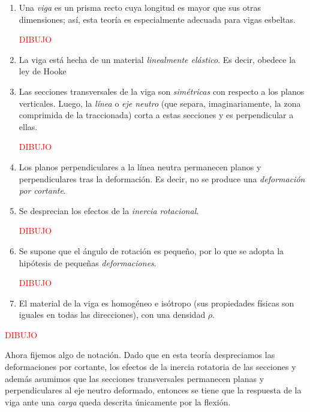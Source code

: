 \begin{enumerate}
    \item Una \textit{viga} es un prisma recto cuya longitud es mayor que sus otras dimensiones; así, esta teoría es especialmente adecuada para vigas esbeltas.

    \textcolor{red}{DIBUJO}

    \item La viga está hecha de un material \textit{linealmente elástico}. Es decir, obedece la ley de Hooke

    \item Las secciones transversales de la viga son \textit{simétricas} con respecto a los planos verticales\footnotemark. Luego, la \textit{línea} o \textit{eje neutro} (que separa, imaginariamente, la zona comprimida de la traccionada) corta a estas secciones y es perpendicular a ellas.

    \textcolor{red}{DIBUJO}

    \item Los planos perpendiculares a la línea neutra permanecen planos y perpendiculares tras la deformación. Es decir, no se produce una \textit{deformación por cortante}.

    \item Se desprecian los efectos de la \textit{inercia rotacional}.

    \textcolor{red}{DIBUJO}

    \item Se supone que el ángulo de rotación es pequeño, por lo que se adopta la hipótesis de pequeñas \textit{deformaciones}.

    \textcolor{red}{DIBUJO}

    \item El material de la viga es homogéneo e isótropo (sus propiedades físicas son iguales en todas las direcciones), con una densidad $\rho$.
\end{enumerate}

\textcolor{red}{DIBUJO}

Ahora fijemos algo de notación. Dado que en esta teoría despreciamos las deformaciones por cortante, los efectos de la inercia rotatoria de las secciones y además asumimos que las secciones transversales permanecen planas y perpendiculares al eje neutro deformado, entonces se tiene que la respuesta de la viga ante una \textit{carga} queda descrita únicamente por la flexión. 


